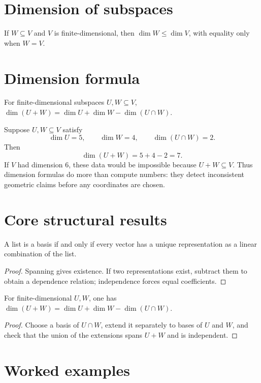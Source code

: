 \section{Dimension of subspaces}
If $W\subseteq V$ and $V$ is finite-dimensional, then $\dim W\le\dim V$, with equality only when $W=V$.

\section{Dimension formula}
For finite-dimensional subspaces $U,W\subseteq V$, $\dim(U+W)=\dim U+\dim W-\dim(U\cap W)$.


\begin{example}\label{ex:i03-expand-03}
Suppose \(U,W\subseteq V\) satisfy
\[
\dim U=5,\qquad \dim W=4,\qquad \dim(U\cap W)=2.
\]
Then
\[
\dim(U+W)=5+4-2=7.
\]
If \(V\) had dimension \(6\), these data would be impossible because
\(U+W\subseteq V\). Thus dimension formulas do more than compute numbers: they
detect inconsistent geometric claims before any coordinates are chosen.
\end{example}
\section{Core structural results}

\begin{theorem}\label{thm:i03-01}
A list is a basis if and only if every vector has a unique representation as a linear combination of the list.
\begin{proof}
Spanning gives existence. If two representations exist, subtract them to obtain a dependence relation; independence forces equal coefficients.
\end{proof}
\end{theorem}

\begin{theorem}\label{thm:i03-02}
For finite-dimensional $U,W$, one has $\dim(U+W)=\dim U+\dim W-\dim(U\cap W)$.
\begin{proof}
Choose a basis of $U\cap W$, extend it separately to bases of $U$ and $W$, and check that the union of the extensions spans $U+W$ and is independent.
\end{proof}
\end{theorem}

\section{Worked examples}

